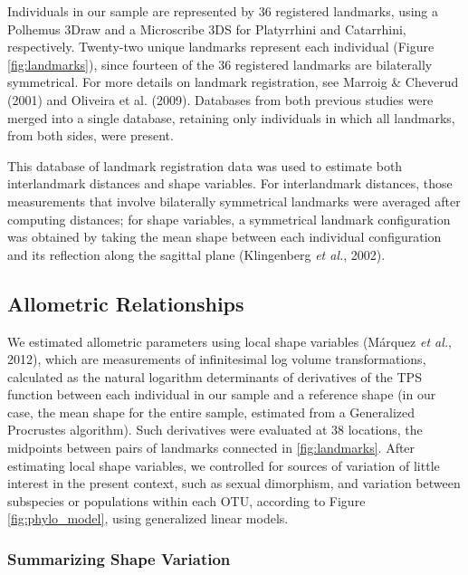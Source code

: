 \documentclass[12pt,twoside]{report}
\begin{document}
Individuals in our sample are represented by 36 registered landmarks,
using a Polhemus 3Draw and a Microscribe 3DS for Platyrrhini and
Catarrhini, respectively. Twenty-two unique landmarks represent each
individual (Figure \ref{fig:landmarks}), since fourteen of the 36
registered landmarks are bilaterally symmetrical. For more details on
landmark registration, see Marroig \& Cheverud (2001) and Oliveira et
al. (2009). Databases from both previous studies were merged into a
single database, retaining only individuals in which all landmarks, from
both sides, were present.

This database of landmark registration data was used to estimate both
interlandmark distances and shape variables. For interlandmark
distances, those measurements that involve bilaterally symmetrical
landmarks were averaged after computing distances; for shape variables,
a symmetrical landmark configuration was obtained by taking the mean
shape between each individual configuration and its reflection along the
sagittal plane (Klingenberg \emph{et al.}, 2002).

\subsection{Allometric Relationships}\label{allometric-relationships}

We estimated allometric parameters using local shape variables (Márquez
\emph{et al.}, 2012), which are measurements of infinitesimal log volume
transformations, calculated as the natural logarithm determinants of
derivatives of the TPS function between each individual in our sample
and a reference shape (in our case, the mean shape for the entire
sample, estimated from a Generalized Procrustes algorithm). Such
derivatives were evaluated at 38 locations, the midpoints between pairs
of landmarks connected in \autoref{fig:landmarks}. After estimating
local shape variables, we controlled for sources of variation of little
interest in the present context, such as sexual dimorphism, and
variation between subspecies or populations within each OTU, according
to Figure \ref{fig:phylo_model}, using generalized linear models.

\subsubsection{Summarizing Shape
Variation}\label{summarizing-shape-variation}
\end{document}
